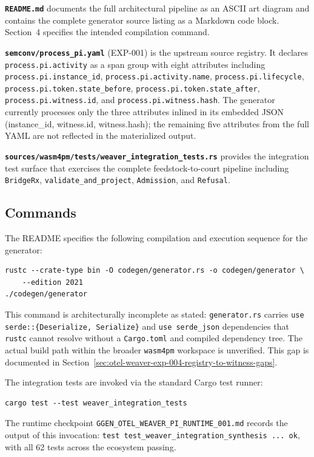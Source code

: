 \textbf{\texttt{README.md}} documents the full architectural pipeline as an ASCII art
diagram and contains the complete generator source listing as a Markdown code block.
Section~4 specifies the intended compilation command.

\textbf{\texttt{semconv/process\_pi.yaml}} (EXP-001) is the upstream source registry. It
declares \texttt{process.pi.activity} as a span group with eight attributes including
\texttt{process.pi.instance\_id}, \texttt{process.pi.activity.name},
\texttt{process.pi.lifecycle}, \texttt{process.pi.token.state\_before},
\texttt{process.pi.token.state\_after}, \texttt{process.pi.witness.id}, and
\texttt{process.pi.witness.hash}. The generator currently processes only the three
attributes inlined in its embedded JSON (instance\_id, witness.id, witness.hash); the
remaining five attributes from the full YAML are not reflected in the materialized output.

\textbf{\texttt{sources/wasm4pm/tests/weaver\_integration\_tests.rs}} provides the
integration test surface that exercises the complete feedstock-to-court pipeline including
\texttt{BridgeRx}, \texttt{validate\_and\_project}, \texttt{Admission}, and \texttt{Refusal}.

\subsection{Commands}
\label{sec:otel-weaver-exp-004-registry-to-witness-commands}

The README specifies the following compilation and execution sequence for the generator:
\begin{verbatim}
rustc --crate-type bin -O codegen/generator.rs -o codegen/generator \
    --edition 2021
./codegen/generator
\end{verbatim}
This command is architecturally incomplete as stated: \texttt{generator.rs} carries
\texttt{use serde::\{Deserialize, Serialize\}} and \texttt{use serde\_json} dependencies
that \texttt{rustc} cannot resolve without a \texttt{Cargo.toml} and compiled dependency
tree. The actual build path within the broader \texttt{wasm4pm} workspace is unverified.
This gap is documented in Section~\ref{sec:otel-weaver-exp-004-registry-to-witness-gaps}.

The integration tests are invoked via the standard Cargo test runner:
\begin{verbatim}
cargo test --test weaver_integration_tests
\end{verbatim}
The runtime checkpoint \texttt{GGEN\_OTEL\_WEAVER\_PI\_RUNTIME\_001.md} records the output
of this invocation: \texttt{test test\_weaver\_integration\_synthesis ... ok}, with all
62 tests across the ecosystem passing.

